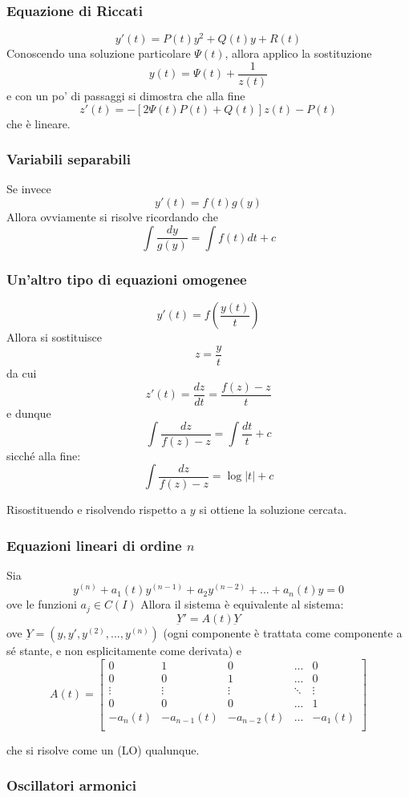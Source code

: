 \documentclass[a4paper,12pt]{article}
\begin{document}
\subsubsection{Equazione di Riccati}
$$y'(t) = P(t)y^2+Q(t)y+R(t)$$
Conoscendo una soluzione particolare $\Psi(t)$, allora applico la sostituzione
$$y(t)=\Psi(t)+\dfrac{1}{z(t)}$$
e con un po' di passaggi si dimostra che alla fine
$$z'(t)= -\left[2\Psi(t)P(t)+Q(t)\right]z(t)-P(t)$$
che è lineare.
\subsubsection{Variabili separabili}
Se invece
$$y'(t) = f(t)g(y)$$
Allora ovviamente si risolve ricordando che
$$\int\dfrac{dy}{g(y)}=\int f(t)dt + c$$
\subsubsection{Un'altro tipo di equazioni omogenee}
$$y'(t) = f\left(\dfrac{y(t)}{t}\right)$$
Allora si sostituisce
$$z=\dfrac{y}{t}$$
da cui $$z'(t) = \dfrac{dz}{dt} = \dfrac{f(z)-z}{t}$$
e dunque
$$\int\dfrac{dz}{f(z)-z}=\int \dfrac{dt}{t} + c$$
sicché alla fine:
$$\int\dfrac{dz}{f(z)-z} = \log|t| + c$$

Risostituendo e risolvendo rispetto a $y$ si ottiene la soluzione cercata.

\subsubsection{Equazioni lineari di ordine $n$}
Sia
$$y^{(n)} + a_1(t)y^{(n-1)} + a_2y^{(n-2)} + ... + a_n(t)y = 0$$
ove le funzioni $a_j \in C(I)$
Allora il sistema è equivalente al sistema:
$$\underbar{Y}' = A(t)\underbar{Y}$$
ove $\underbar{Y}=(y, y', y^{(2)}, ..., y^{(n)})$ (ogni componente è trattata come componente a sé stante, e non esplicitamente come derivata) e
$$A(t) =
\begin{bmatrix}
0 & 1 & 0 & ... & 0\\
0 & 0 & 1 & ... & 0\\
\vdots & \vdots & \vdots & \ddots & \vdots \\
0 & 0 & 0 & ... & 1 \\
-a_n(t) & -a_{n-1}(t) & -a_{n-2}(t) & ... & -a_{1}(t) \\
\end{bmatrix}
$$

che si risolve come un (LO) qualunque.

\subsubsection{Oscillatori armonici}
\end{document}
